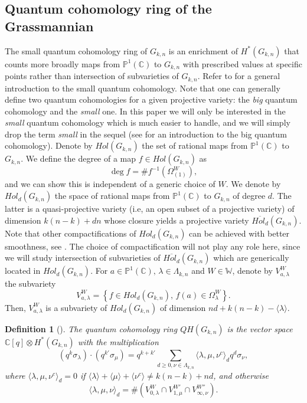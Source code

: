 \documentclass[10pt,11pt]{amsart}%
\newtheorem{definition}[theorem]{Definition}
\begin{document}
\subsection{Quantum cohomology ring of the Grassmannian} The small quantum cohomology ring of $G_{k,n}$ is an enrichment of $H^*(G_{k,n})$ that counts more broadly maps from $\mathbb{P}^1(\mathbb{C})$ to $G_{k,n}$ with prescribed values at specific points rather than intersection of subvarieties of $G_{k,n}$. Refer to \cite{B,BCF} for a general introduction to the small quantum cohomology. Note that one can generally define two quantum cohomologies for a given projective variety: the {\it big} quantum cohomology and the {\it small} one. In this paper we will only be interested in the {\it small} quantum cohomology which is much easier to handle, and we will simply drop the term {\it small} in the sequel (see \cite{KV} for an introduction to the big quantum cohomology). Denote by $Hol(G_{k,n})$ the set of rational maps from $\mathbb{P}^1(\mathbb{C})$ to $G_{k,n}$. We define the degree of a map $f\in Hol(G_{k,n})$ as 
$$\deg f=\#f^{-1}\left(\Omega_{(1)}^W\right),$$
and we can show this is independent of a generic choice of $W$. We denote by $Hol_{d}(G_{k,n})$ the space of rational maps from $\mathbb{P}^1(\mathbb{C})$ to $G_{k,n}$ of degree $d$. The latter is a quasi-projective variety (i.e, an open subset of a projective variety) of dimension $k(n-k)+dn$ whose closure yields a projective variety $\overline{Hol_{d}}(G_{k,n})$. Note that other compactifications of $Hol_{d}(G_{k,n})$ can be achieved with better smoothness, see \cite{B}. The choice of compactification will not play any role here, since we will study intersection of subvarieties of $\overline{Hol_{d}}(G_{k,n})$ which are generically located in $Hol_{d}(G_{k,n})$. For $a\in\mathbb{P}^1(\mathbb{C}), \, \lambda\in \Lambda_{k,n}$ and $W\in \mathbb{W}$, denote by $V_{a,\lambda}^W$ the subvariety 
$$V_{a,\lambda}^W=\left\{f\in Hol_d(G_{k,n}),\, f(a)\in\Omega_{\lambda}^W\right\}.$$
Then, $V_{a,\lambda}^W$ is a subvariety of $Hol_{d}(G_{k,n})$ of dimension $nd+k(n-k)-\langle \lambda\rangle$.
\begin{definition}[\cite{B}]
The quantum cohomology ring $QH(G_{k,n})$ is the vector space $\mathbb{C}[q]\otimes H^*(G_{k,n})$ with the multiplication
\begin{equation}\label{eq:multiplication_quantum}(q^k\sigma_\lambda)\cdot (q^{k'}\sigma_\mu)=q^{k+k'}\sum_{d\geq 0,\nu\in \Lambda_{k,n}}\langle\lambda,\mu,\nu^c\rangle_dq^d\sigma_{\nu},
\end{equation}
where $\langle\lambda,\mu,\nu^c\rangle_d=0$ if $\langle \lambda\rangle+\langle\mu\rangle+\langle \nu^c\rangle\not=k(n-k)+nd$, and otherwise
$$\langle\lambda,\mu,\nu\rangle_d=\# \left(V_{0,\lambda}^W\cap V_{1,\mu}^{W'}\cap V_{\infty,\nu}^{W''}\right).$$
\end{definition}
\end{document}
